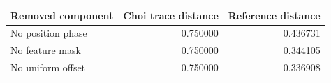 \begin{center}
{\small
\setlength{\tabcolsep}{4pt}
\begin{tabular}{@{}lrr@{}}
\toprule
Removed component & Choi trace distance & Reference distance \\
\midrule
No position phase & 0.750000 & 0.436731 \\
No feature mask & 0.750000 & 0.344105 \\
No uniform offset & 0.750000 & 0.336908 \\
\bottomrule
\end{tabular}}
\end{center}
